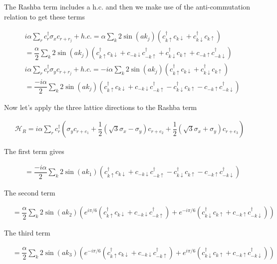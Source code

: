 The Rashba term includes a h.c. and then we make use of the anti-commutation relation to get these terms

\begin{align}
  &i\alpha\sum\limits_{r} c^{\dagger}_{r}\sigma_x c_{r+r_j} + h.c. = \alpha \sum\limits_{k} 2\sin(ak_j)(c^{\dagger}_{k\uparrow}c_{k\downarrow} + c^{\dagger}_{k\downarrow}c_{k\uparrow}) \\
  &= \dfrac{\alpha}{2} \sum\limits_{k} 2\sin(ak_j)(c^{\dagger}_{k\uparrow}c_{k\downarrow} + c_{-k\downarrow}c^{\dagger}_{-k\uparrow} + c^{\dagger}_{k\downarrow}c_{k\uparrow}+ c_{-k\uparrow}c^{\dagger}_{-k\downarrow}) \\
  &i\alpha\sum\limits_{r} c^{\dagger}_{r}\sigma_y c_{r+r_j} + h.c. = -i\alpha \sum\limits_{k} 2\sin(ak_j)(c^{\dagger}_{k\uparrow}c_{k\downarrow} + c^{\dagger}_{k\downarrow}c_{k\uparrow}) \\
  &= \dfrac{-i\alpha}{2} \sum\limits_{k} 2\sin(ak_j)(c^{\dagger}_{k\uparrow}c_{k\downarrow} + c_{-k\downarrow}c^{\dagger}_{-k\uparrow} - c^{\dagger}_{k\downarrow}c_{k\uparrow}- c_{-k\uparrow}c^{\dagger}_{-k\downarrow})
\end{align}

Now let's apply the three lattice directions to the Rashba term

\begin{align}
  \mathcal{H}_R = i\alpha \sum\limits_{r} c^{\dagger}_r (\sigma_y c_{r+e_1} +\dfrac{1}{2}(\sqrt{3}\sigma_x -\sigma_y)c_{r+e_2} + \dfrac{1}{2}(\sqrt{3}\sigma_x + \sigma_y)c_{r+e_3})
\end{align}

The first term gives 

\begin{align}
  &= \dfrac{-i\alpha}{2} \sum\limits_{k} 2\sin(ak_1)(c^{\dagger}_{k\uparrow}c_{k\downarrow} + c_{-k\downarrow}c^{\dagger}_{-k\uparrow} - c^{\dagger}_{k\downarrow}c_{k\uparrow}- c_{-k\uparrow}c^{\dagger}_{-k\downarrow})
\end{align}

The second term

\begin{align}
  &= \dfrac{\alpha}{2}\sum\limits_k 2\sin(ak_2)(e^{i\pi/6}(c^{\dagger}_{k\uparrow}c_{k\downarrow} + c_{-k\downarrow}c^{\dagger}_{-k\uparrow}) + e^{-i\pi/6}(c^{\dagger}_{k\downarrow}c_{k\uparrow}+ c_{-k\uparrow}c^{\dagger}_{-k\downarrow}))
\end{align}

The third term

\begin{align}
  &= \dfrac{\alpha}{2}\sum\limits_k 2\sin(ak_3)(e^{-i\pi/6}(c^{\dagger}_{k\uparrow}c_{k\downarrow} + c_{-k\downarrow}c^{\dagger}_{-k\uparrow}) + e^{i\pi/6}(c^{\dagger}_{k\downarrow}c_{k\uparrow}+ c_{-k\uparrow}c^{\dagger}_{-k\downarrow}))
\end{align}

